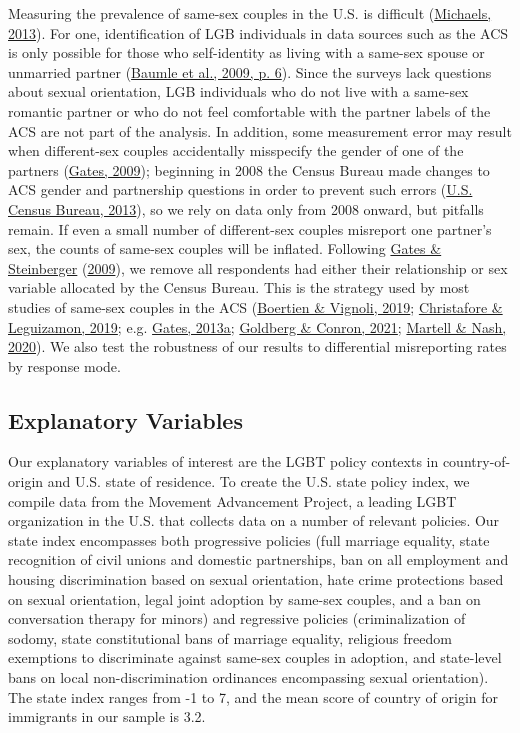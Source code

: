 \documentclass[
  11pt,
]{article}
\begin{document}
Measuring the prevalence of same-sex couples in the U.S. is difficult (\protect\hyperlink{ref-michaels_2013}{Michaels, 2013}). For one, identification of LGB individuals in data sources such as the ACS is only possible for those who self-identity as living with a same-sex spouse or unmarried partner (\protect\hyperlink{ref-baumle_2009}{Baumle et al., 2009, p. 6}). Since the surveys lack questions about sexual orientation, LGB individuals who do not live with a same-sex romantic partner or who do not feel comfortable with the partner labels of the ACS are not part of the analysis. In addition, some measurement error may result when different-sex couples accidentally misspecify the gender of one of the partners (\protect\hyperlink{ref-gates_2009a}{Gates, 2009}); beginning in 2008 the Census Bureau made changes to ACS gender and partnership questions in order to prevent such errors (\protect\hyperlink{ref-u.s.censusbureau_2013}{U.S. Census Bureau, 2013}), so we rely on data only from 2008 onward, but pitfalls remain. If even a small number of different-sex couples misreport one partner's sex, the counts of same-sex couples will be inflated. Following \protect\hyperlink{ref-gates_2009}{Gates \& Steinberger} (\protect\hyperlink{ref-gates_2009}{2009}), we remove all respondents had either their relationship or sex variable allocated by the Census Bureau. This is the strategy used by most studies of same-sex couples in the ACS (\protect\hyperlink{ref-boertien_2019}{Boertien \& Vignoli, 2019}; \protect\hyperlink{ref-christafore_2019}{Christafore \& Leguizamon, 2019}; e.g. \protect\hyperlink{ref-gates_2013}{Gates, 2013a}; \protect\hyperlink{ref-goldberg_2021}{Goldberg \& Conron, 2021}; \protect\hyperlink{ref-martell_2020}{Martell \& Nash, 2020}). We also test the robustness of our results to differential misreporting rates by response mode.

\hypertarget{explanatory-variables}{%
\subsection{Explanatory Variables}\label{explanatory-variables}}

Our explanatory variables of interest are the LGBT policy contexts in country-of-origin and U.S. state of residence. To create the U.S. state policy index, we compile data from the Movement Advancement Project, a leading LGBT organization in the U.S. that collects data on a number of relevant policies. Our state index encompasses both progressive policies (full marriage equality, state recognition of civil unions and domestic partnerships, ban on all employment and housing discrimination based on sexual orientation, hate crime protections based on sexual orientation, legal joint adoption by same-sex couples, and a ban on conversation therapy for minors) and regressive policies (criminalization of sodomy, state constitutional bans of marriage equality, religious freedom exemptions to discriminate against same-sex couples in adoption, and state-level bans on local non-discrimination ordinances encompassing sexual orientation). The state index ranges from -1 to 7, and the mean score of country of origin for immigrants in our sample is 3.2.
\end{document}
